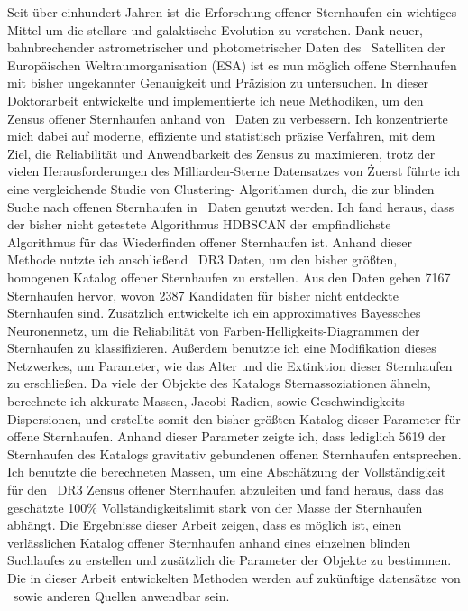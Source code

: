 Seit über einhundert Jahren ist die Erforschung offener Sternhaufen ein wichtiges Mittel um die stellare und galaktische Evolution zu verstehen.
Dank neuer, bahnbrechender astrometrischer und photometrischer Daten des \gaia\ Satelliten der Europäischen Weltraumorganisation (ESA) ist es nun möglich offene Sternhaufen mit bisher ungekannter Genauigkeit und Präzision zu untersuchen.
In dieser Doktorarbeit entwickelte und implementierte ich neue Methodiken, um den Zensus offener Sternhaufen anhand von \gaia\ Daten zu verbessern.
Ich konzentrierte mich dabei auf moderne, effiziente und statistisch präzise Verfahren, mit dem Ziel, die Reliabilität und Anwendbarkeit des Zensus zu maximieren, trotz der vielen Herausforderungen des Milliarden-Sterne Datensatzes von \gaia\.
Zuerst führte ich eine vergleichende Studie von Clustering- Algorithmen durch, die zur blinden Suche nach offenen Sternhaufen in \gaia\ Daten genutzt werden.
Ich fand heraus, dass der bisher nicht getestete Algorithmus HDBSCAN der empfindlichste Algorithmus für das Wiederfinden offener Sternhaufen ist.
Anhand dieser Methode nutzte ich anschließend \gaia\ DR3 Daten, um den bisher größten, homogenen Katalog offener Sternhaufen zu erstellen. Aus den Daten gehen 7167 Sternhaufen hervor, wovon 2387 Kandidaten für bisher nicht entdeckte Sternhaufen sind.
Zusätzlich entwickelte ich ein approximatives Bayessches Neuronennetz, um die Reliabilität von Farben-Helligkeits-Diagrammen der Sternhaufen zu klassifizieren.
Außerdem benutzte ich eine Modifikation dieses Netzwerkes, um Parameter, wie das Alter und die Extinktion dieser Sternhaufen zu erschließen.
Da viele der Objekte des Katalogs Sternassoziationen ähneln, berechnete ich akkurate Massen, Jacobi Radien, sowie Geschwindigkeits-Dispersionen, und erstellte somit den bisher größten Katalog dieser Parameter für offene Sternhaufen.
Anhand dieser Parameter zeigte ich, dass lediglich 5619 der Sternhaufen des Katalogs gravitativ gebundenen offenen Sternhaufen entsprechen.
Ich benutzte die berechneten Massen, um eine Abschätzung der Vollständigkeit für den \gaia\ DR3 Zensus offener Sternhaufen abzuleiten und fand heraus, dass das geschätzte 100\% Vollständigkeitslimit stark von der Masse der Sternhaufen abhängt.
Die Ergebnisse dieser Arbeit zeigen, dass es möglich ist, einen verlässlichen Katalog offener Sternhaufen anhand eines einzelnen blinden Suchlaufes zu erstellen und zusätzlich die Parameter der Objekte zu bestimmen.
Die in dieser Arbeit entwickelten Methoden werden auf zukünftige datensätze von \gaia\ sowie anderen Quellen anwendbar sein.

